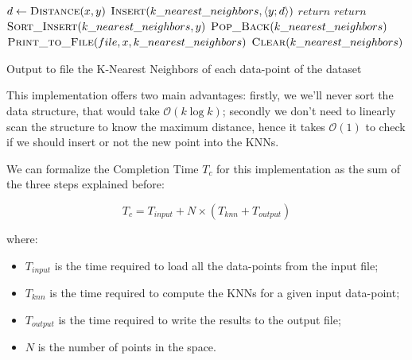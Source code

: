 \documentclass[12pt, letterpaper]{article}  %
\newcommand{\bigO}{\mathcal{O}}
\begin{document}
\begin{algorithm}
    \begin{algorithmic}
                    \State $d \gets \textsc{Distance}(x, y)$
                        \State $\textsc{Insert}(k\_nearest\_neighbors, \left < y ; d \right >)$
                        \State $return$
                    \EndIf
                        \State $return$ 
                    \EndIf
                    \State $\textsc{Sort\_Insert}(k\_nearest\_neighbors, y)$
                            \State $\textsc{Pop\_Back}(k\_nearest\_neighbors)$
                    \EndIf
                \EndFor
                \State $\textsc{Print\_to\_File}(file, x, k\_nearest\_neighbors)$
                \State $\textsc{Clear}(k\_nearest\_neighbors)$
            \EndFor
        \EndFunction
    \end{algorithmic}
    \caption{Output to file the K-Nearest Neighbors of each data-point of the dataset}
    \label{algo:efficient_knn}
\end{algorithm}

This implementation offers two main advantages: firstly, we we'll never sort the data structure, that would take $\bigO(k\log k)$; secondly we don't need to linearly scan the structure to know the maximum distance, hence it takes $\bigO(1)$ to check if we should insert or not the new point into the KNNs.

We can formalize the Completion Time \textit{$T_c$} for this implementation as the sum of the three steps explained before:

\begin{equation}
    \textit{$T_{c}$} = \textit{$T_{input}$} + \textit{$N$} \times (\textit{$T_{knn}$} + \textit{$T_{output}$})
    \label{eq:sequential_tc}
\end{equation}

where:
\begin{itemize}
    \item \textit{$T_{input}$} is the time required to load all the data-points from the input file;
    \item \textit{$T_{knn}$} is the time required to compute the KNNs for a given input data-point;
    \item \textit{$T_{output}$} is the time required to write the results to the output file;
    \item \textit{$N$} is the number of points in the space.
\end{itemize}
\newpage
\end{document}
